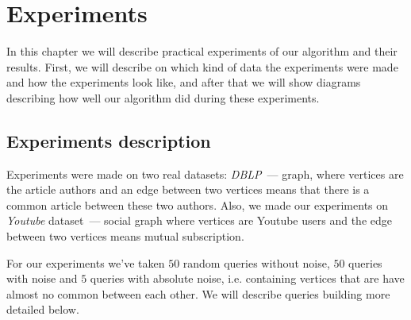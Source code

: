 \chapter{Experiments}

In this chapter we will describe practical experiments of our algorithm and their results. First, we will describe on which kind of data the experiments were made and how the experiments look like, and after that we will show diagrams describing how well our algorithm did during these experiments.

\section{Experiments description}

Experiments were made on two real datasets: \textit{DBLP}~--- graph, where vertices are the article authors and an edge between two vertices means that there is a common article between these two authors. Also, we made our experiments on \textit{Youtube} dataset~--- social graph where vertices are Youtube users and the edge between two vertices means mutual subscription.

For our experiments we've taken $50$ random queries without noise, $50$ queries with noise and $5$ queries with absolute noise, i.e. containing vertices that are have almost no common between each other. We will describe queries building more detailed below.

